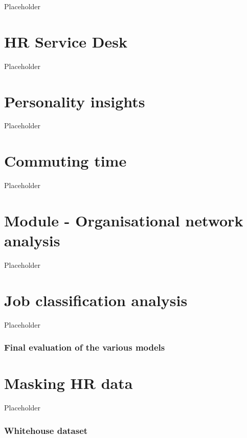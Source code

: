 \documentclass[12pt, krantz2,]{krantz}
\begin{document}
Placeholder

\hypertarget{service_desk}{%
\chapter{HR Service Desk}\label{service_desk}}

Placeholder

\hypertarget{personality}{%
\chapter{Personality insights}\label{personality}}

Placeholder

\hypertarget{commuting_time}{%
\chapter{Commuting time}\label{commuting_time}}

Placeholder

\hypertarget{orgnisational_network}{%
\chapter{Module - Organisational network analysis}\label{orgnisational_network}}

Placeholder

\hypertarget{job_classification}{%
\chapter{Job classification analysis}\label{job_classification}}

Placeholder

\hypertarget{final-evaluation-of-the-various-models}{%
\subsection{Final evaluation of the various models}\label{final-evaluation-of-the-various-models}}

\hypertarget{masking_data}{%
\chapter{Masking HR data}\label{masking_data}}

Placeholder

\hypertarget{whitehouse-dataset}{%
\subsection{Whitehouse dataset}\label{whitehouse-dataset}}
\end{document}
